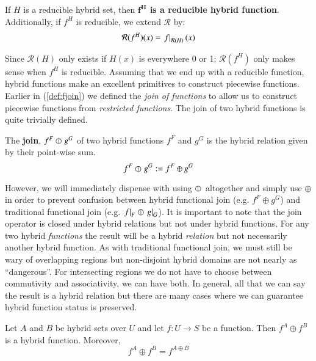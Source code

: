 \begin{definition}
	If $H$ is a reducible hybrid set, then \textbf{$\boldsymbol{f^H}$ is a reducible hybrid function}. 
	Additionally, if $f^H$ is reducible, we extend $\mathcal{R}$ by:
	\begin{equation}
		\mathcal{R}(f^H)(x) = \left.f\right|_{\mathcal{R}(H)}(x)
	\end{equation}
\end{definition}


Since $\mathcal{R}(H)$ only exists if $H(x)$ is everywhere 0 or 1; 
$\mathcal{R}(f^H)$ only makes sense when $f^H$ is reducible.
Assuming that we end up with a reducible function, hybrid functions make an excellent primitives to construct piecewise functions.
Earlier in (\ref{def:fjoin}) we defined the \emph{join of functions} to allow us to construct piecewise functions from \emph{restricted functions}.
The join of two hybrid functions is quite trivially defined.

 
\begin{definition}
	The \textbf{join}, $f^F \varobar^{} g^G$ of two hybrid functions $f^F$ and $g^G$ is 
	the hybrid relation given by their point-wise sum.
	\begin{equation} \label{def:hjoin}
		f^F \varobar^{} g^G := f^F \oplus g^G
	\end{equation}
\end{definition}


However, we will immediately dispense with using $\varobar^{}$ altogether and simply use $\oplus$ 
in order to prevent confusion between hybrid functional join (e.g. $f^F \oplus g^G$) and 
traditional functional join (e.g. $\left.f\right|_{F} \varobar \left.g\right|_{G}$).
It is important to note that the join operator is closed under hybrid relations but not under hybrid functions.
For any two hybrid \emph{functions} the result will be a hybrid \emph{relation} 
but not necessarily another hybrid function.
As with traditional functional join, we must still be wary of overlapping regions
 but non-disjoint hybrid domains are not nearly as ``dangerous''.
For intersecting regions we do not have to choose between commutivity and associativity, we can have both.
In general, all that we can say the result is a hybrid relation but there are many cases where we can guarantee hybrid function status is preserved.


\begin{theorem}
\label{thm:reducible1}
Let $A$ and $B$ be hybrid sets over $U$ and let $f: U \to S$ be a function.
Then $f^A \oplus f^B$ is a hybrid function.
Moreover,
	\begin{equation}
		f^A \oplus f^B = f^{A \oplus B}
	\end{equation}
\end{theorem}



